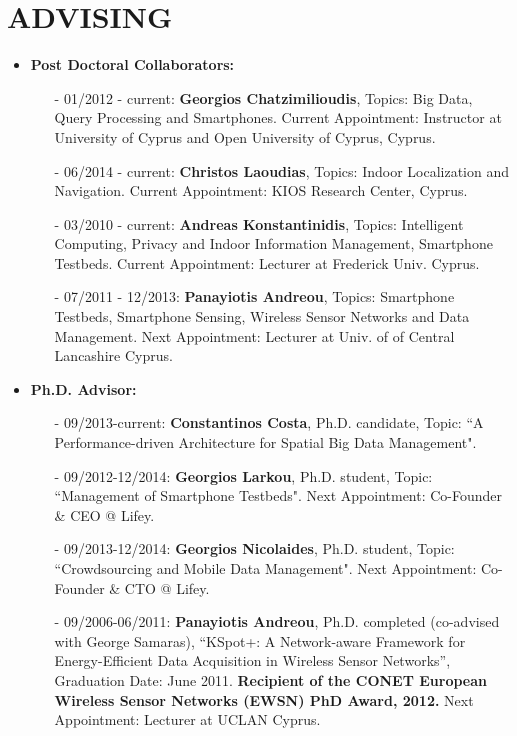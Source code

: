 \documentclass[10pt]{article}
\begin{document}
\section{\bf ADVISING}
\begin{itemize}
   \setlength{\itemsep}{0.80ex}

    \item {\bf Post Doctoral Collaborators:} 
	\begin{itemize}
		\setlength{\itemsep}{0.10ex}
            \item[-] 01/2012 - current: {\bf Georgios Chatzimilioudis}, Topics: Big Data, Query Processing and Smartphones. Current Appointment: Instructor at University of Cyprus and Open University of Cyprus, Cyprus.
            \item[-] 06/2014 - current: {\bf Christos Laoudias}, Topics: Indoor Localization and Navigation. Current Appointment: KIOS Research Center, Cyprus.
			\item[-] 03/2010 - current: {\bf Andreas Konstantinidis}, Topics: Intelligent Computing, Privacy and Indoor Information Management, Smartphone Testbeds. Current Appointment: Lecturer at Frederick Univ. Cyprus.
            \item[-] 07/2011 - 12/2013: {\bf Panayiotis Andreou}, Topics: Smartphone Testbeds, Smartphone Sensing, Wireless Sensor Networks and Data Management. Next Appointment: Lecturer at Univ. of of Central Lancashire Cyprus.
	\end{itemize}
        
    \item {\bf Ph.D. Advisor:}
	\begin{itemize}
		\setlength{\itemsep}{0.10ex}
			\item[-] 09/2013-current: {\bf Constantinos Costa}, Ph.D. candidate, Topic: ``A Performance-driven Architecture for Spatial Big Data Management".
			\item[-] 09/2012-12/2014: {\bf Georgios Larkou}, Ph.D. student, Topic: ``Management of Smartphone Testbeds". Next Appointment: Co-Founder \& CEO @ Lifey.
            \item[-] 09/2013-12/2014: {\bf Georgios Nicolaides}, Ph.D. student, Topic: ``Crowdsourcing and Mobile Data Management". Next Appointment: Co-Founder \& CTO @ Lifey.
            \item[-] 09/2006-06/2011: {\bf Panayiotis Andreou}, Ph.D. completed (co-advised with George Samaras), ``KSpot+: A Network-aware Framework for Energy-Efficient Data Acquisition in Wireless Sensor Networks'', Graduation Date: June 2011. {\bf Recipient of the CONET European Wireless Sensor Networks (EWSN) PhD Award, 2012.} Next Appointment: Lecturer at UCLAN Cyprus.
	\end{itemize}


\end{itemize}
\end{document}
